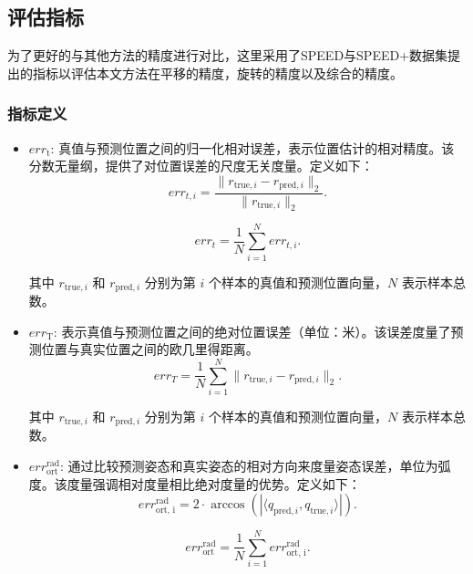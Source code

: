 \subsection{评估指标}
为了更好的与其他方法的精度进行对比，这里采用了SPEED与SPEED+数据集提出的指标以评估本文方法在平移的精度，旋转的精度以及综合的精度。
\subsubsection{指标定义}

\begin{itemize}
	\item $err_{\text{t}}$: 真值与预测位置之间的归一化相对误差，表示位置估计的相对精度。该分数无量纲，提供了对位置误差的尺度无关度量。定义如下：
	\begin{equation}
		err_{t,i} = \frac{\| r_{\text{true},i} - r_{\text{pred},i} \|_2}{\| r_{\text{true},i} \|_2}.
	\end{equation}
	
	\begin{equation}
		err_t = \frac{1}{N} \sum\limits_{i=1}^{N} err_{t,i}.
	\end{equation}
	
	其中 $r_{\text{true},i}$ 和 $r_{\text{pred},i}$ 分别为第 $i$ 个样本的真值和预测位置向量，$N$ 表示样本总数。
	
	\item $err_{\text{T}}$: 表示真值与预测位置之间的绝对位置误差（单位：米）。该误差度量了预测位置与真实位置之间的欧几里得距离。
	\begin{equation}
		err_T = \frac{1}{N}\sum\limits_{i=1}^{N} \| r_{\text{true},i} - r_{\text{pred},i} \|_2.
	\end{equation}
	
	其中 $r_{\text{true},i}$ 和 $r_{\text{pred},i}$ 分别为第 $i$ 个样本的真值和预测位置向量，$N$ 表示样本总数。
	
	\item $err_{\text{ort}}^{\text{rad}}$: 通过比较预测姿态和真实姿态的相对方向来度量姿态误差，单位为弧度。该度量强调相对度量相比绝对度量的优势。定义如下：
	\begin{equation}
		err_{\text{ort, i}}^{\text{rad}} =  2 \cdot \arccos \left( \left| \langle q_{\text{pred},i}, q_{\text{true},i} \rangle \right| \right).
	\end{equation}
	
	\begin{equation}
		err_{\text{ort}}^{\text{rad}} = \frac{1}{N}\sum\limits_{i=1}^N err_{\text{ort, i}}^{\text{rad}}.
	\end{equation}
	

\end{itemize}
